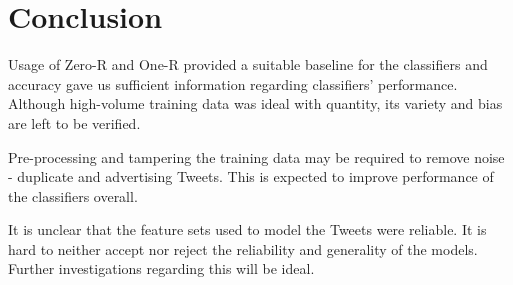 \documentclass[11pt]{article}
\begin{document}
\section{Conclusion}
Usage of Zero-R and One-R provided a suitable baseline for the classifiers and accuracy gave us sufficient information regarding classifiers' performance. Although high-volume training data was ideal with quantity, its variety and bias are left to be verified.\newline

Pre-processing and tampering the training data may be required to remove noise - duplicate and advertising Tweets. This is expected to improve performance of the classifiers overall.\newline

It is unclear that the feature sets used to model the Tweets were reliable. It is hard to neither accept nor reject the reliability and generality of the models. Further investigations regarding this will be ideal.




\end{document}
